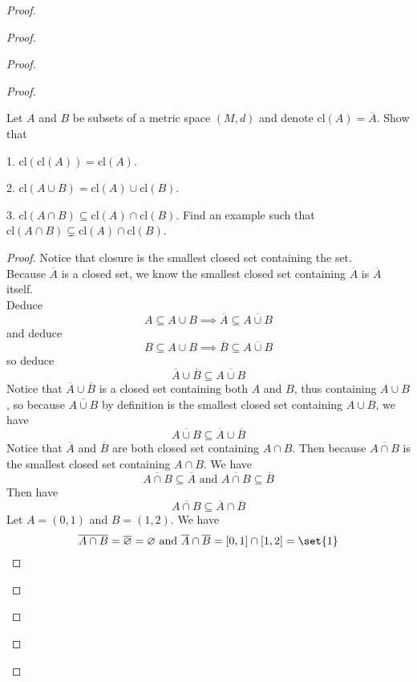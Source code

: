 \documentclass{report}
\begin{document}
\begin{proof}
\begin{proof}
\begin{proof}
\begin{proof}
\begin{question}{}{}
Let \( A \) and \( B \) be subsets of a metric space \( (M, d) \) and denote \( \text{cl}(A) = \overline{A} \). Show that

1. \( \text{cl}(\text{cl}(A)) = \text{cl}(A) \).

2. \( \text{cl}(A \cup B) = \text{cl}(A) \cup \text{cl}(B) \).

3. \( \text{cl}(A \cap B) \subseteq \text{cl}(A) \cap \text{cl}(B) \). Find an example such that \( \text{cl}(A \cap B) \subsetneq \text{cl}(A) \cap \text{cl}(B) \).
\end{question}
\begin{proof}
Notice that closure is the smallest closed set containing the set.\\

Because $\overline{A}$ is a closed set, we know the smallest closed set containing $\overline{A}$ is $\overline{A}$ itself.\\

Deduce
\begin{equation*}
A\subseteq A\cup B\implies \overline{A}\subseteq \overline{A\cup B}
\end{equation*}
and deduce
\begin{equation*}
B\subseteq A\cup B\implies \overline{B}\subseteq \overline{A\cup B}
\end{equation*}
so deduce
\begin{equation*}
\overline{A}\cup \overline{B}\subseteq \overline{A\cup B}
\end{equation*}
Notice that $\overline{A}\cup \overline{B}$ is a closed set containing both $A$ and  $B$, thus containing $A\cup B$, so because $\overline{A\cup B}$ by definition is the smallest closed set containing $A\cup B$, we have
\begin{equation*}
\overline{A\cup B}\subseteq \overline{A}\cup \overline{B}
\end{equation*}
Notice that $\overline{A}$ and $\overline{B}$ are both closed set containing $A\cap B$. Then because $\overline{A\cap B}$ is the smallest closed set containing  $A\cap B$. We have
\begin{equation*}
\overline{A\cap B}\subseteq \overline{A}\text{ and }\overline{A\cap B}\subseteq \overline{B}
\end{equation*}
Then have
\begin{equation*}
\overline{A\cap B}\subseteq \overline{A}\cap \overline{B}
\end{equation*}
Let $A=(0,1)$ and $B=(1,2)$. We have
\begin{equation*}
\overline{A\cap B}=\overline{\varnothing}=\varnothing\text{ and }\overline{A}\cap \overline{B}=[0,1]\cap [1,2]=\set{1}
\end{equation*}
\end{proof}
\begin{question}{}{}


\end{question}
\end{proof}
\end{proof}
\end{proof}
\end{proof}
\end{document}
